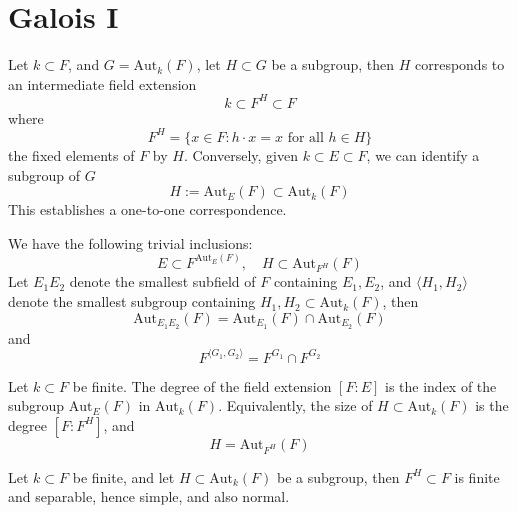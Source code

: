 \documentclass[openany]{book}
\newcommand{\la}{\langle}
\newcommand{\ra}{\rangle}
\newcommand{\aut}{\text{Aut}}
\begin{document}
\section{Galois I}


\begin{defn}
    Let $k\subset F$, and $G=\aut_k(F)$, let $H\subset G$ be a subgroup, then $H$ corresponds to an intermediate field extension 
    \begin{equation*}
        k\subset F^H\subset F
    \end{equation*}
    where 
    \begin{equation*}
        F^H=\{x\in F: h\cdot x=x \text{ for all } h\in H\}
    \end{equation*}
    the fixed elements of $F$ by $H$. Conversely, given $k\subset E\subset F$, we can identify a subgroup of $G$ 
    \begin{equation*}
        H:=\aut_E(F)\subset\aut_k(F)
    \end{equation*}
    This establishes a one-to-one correspondence.
\end{defn}

\begin{prop}
    We have the following trivial inclusions:
    \begin{equation*}
        E\subset F^{\aut_E(F)}, \quad H\subset\aut_{F^H}(F)
    \end{equation*}
    Let $E_1E_2$ denote the smallest subfield of $F$ containing $E_1,E_2$, and $\la H_1,H_2\ra$ denote the smallest subgroup containing $H_1,H_2\subset\aut_k(F)$, then 
    \begin{equation*}
        \aut_{E_1E_2}(F)=\aut_{E_1}(F)\cap\aut_{E_2}(F)
    \end{equation*}
    and 
    \begin{equation*}
        F^{\la G_1,G_2\ra}=F^{G_1}\cap F^{G_2}
    \end{equation*}
\end{prop}

\begin{prop}
    Let $k\subset F$ be finite. The degree of the field extension $[F:E]$ is the index of the subgroup $\aut_E(F)$ in $\aut_k(F)$. Equivalently, the size of $H\subset\aut_k(F)$ is the degree $[F:F^H]$, and 
    \begin{equation*}
        H=\aut_{F^H}(F)
    \end{equation*}
\end{prop}


\begin{prop}
    Let $k\subset F$ be finite, and let $H\subset\aut_k(F)$ be a subgroup, then $F^H\subset F$ is finite and separable, hence simple, and also normal. 
\end{prop}
\end{document}
